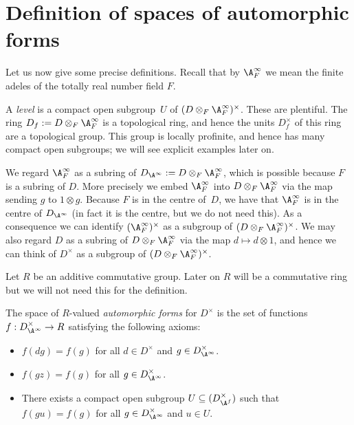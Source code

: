 \section{Definition of spaces of automorphic forms}

Let us now give some precise definitions. Recall that by $\A_F^\infty$ we mean the finite adeles of the totally real number field $F$.

A \emph{level} is a compact open subgroup~$U$ of $(D\otimes_F\A_F^\infty)^\times$. These are
plentiful. The ring $D_f:=D\otimes_F\A_F^\infty$ is a topological ring,
and hence the units $D_f^\times$ of this ring
are a topological group. This group is locally profinite, and hence has many compact open subgroups;
we will see explicit examples later on.

We regard $\A_F^\infty$ as a subring of $D_{\A^\infty}:=D\otimes_F\A_F^\infty$, which is possible because
$F$ is a subring of $D$. More precisely we embed $\A_F^\infty$ into $D\otimes_F\A_F^\infty$
via the map sending $g$ to $1\otimes g$. Because $F$ is in the centre of~$D$, we have
that $\A_F^\infty$ is in the centre of $D_{\A^\infty}$ (in fact it is the centre, but we do not need this).
As a consequence we can identify $(\A_F^\infty)^\times$ as a subgroup of $(D\otimes_F\A_F^\infty)^\times$.
We may also regard $D$ as a subring of $D\otimes_F\A_F^\infty$ via the map $d\mapsto d\otimes 1$, and hence
we can think of $D^\times$ as a subgroup of $(D\otimes_F\A_F^\infty)^\times$.

Let $R$ be an additive commutative group. Later on $R$ will be a commutative ring but we will not need this for the definition.
\begin{definition}
  \label{TotallyDefiniteQuaternionAlgebra.WeightTwoAutomorphicForm}
  \leanok
  The space of $R$-valued \emph{automorphic forms} for $D^\times$ is the set of
  functions $f:D_{\A^\infty}^\times\to R$ satisfying the following axioms:
  \begin{itemize}
    \item $f(dg)=f(g)$ for all $d\in D^\times$ and $g\in D_{\A^\infty}^\times$.
    \item $f(gz)=f(g)$ for all $g\in D_{\A^\infty}^\times$.
    \item There exists a compact open subgroup $U\subseteq (D_{\A^f}^\times)$ such that $f(gu)=f(g)$ for all $g\in D_{\A^\infty}^\times$ and $u\in U$.
  \end{itemize}
\end{definition}

